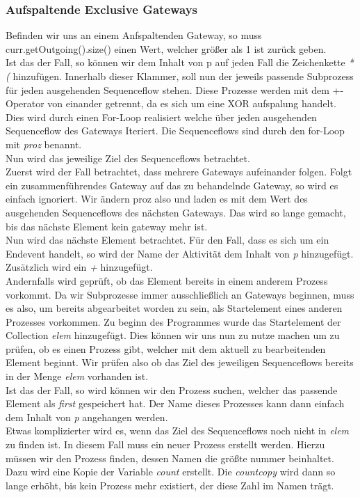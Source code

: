 \subsubsection{Aufspaltende Exclusive Gateways}
Befinden wir uns an einem Anfspaltenden Gateway, so muss curr.getOutgoing().size() einen Wert, welcher größer als 1 ist zurück geben.\\
Ist das der Fall, so können wir dem Inhalt von p auf jeden Fall die Zeichenkette \textit{*(} hinzufügen. Innerhalb dieser Klammer, soll nun der jeweils passende Subprozess für jeden ausgehenden Sequenceflow stehen. Diese Prozesse werden mit dem +-Operator von einander getrennt, da es sich um eine XOR aufspalung handelt.\\
Dies wird durch einen For-Loop realisiert welche über jeden ausgehenden Sequenceflow des Gateways Iteriert. Die Sequenceflows sind durch den for-Loop mit \textit{proz} benannt.\\
Nun wird das jeweilige Ziel des Sequenceflows betrachtet.\\
Zuerst wird der Fall betrachtet, dass mehrere Gateways aufeinander folgen. Folgt ein zusammenführendes Gateway auf das zu behandelnde Gateway, so wird es einfach ignoriert. Wir ändern proz also und laden es mit dem Wert des ausgehenden Sequenceflows des nächsten Gateways. Das wird so lange gemacht, bis das nächste Element kein gateway mehr ist.\\
Nun wird das nächste Element betrachtet.
Für den Fall, dass es sich um ein Endevent handelt, so wird der Name der Aktivität dem Inhalt von \textit{p} hinzugefügt. Zusätzlich wird ein \textit{+} hinzugefügt.\\
Andernfalls wird geprüft, ob das Element bereits in einem anderem Prozess vorkommt. Da wir Subprozesse immer ausschließlich an Gateways beginnen, muss es also, um bereits abgearbeitet worden zu sein, als Startelement eines anderen Prozesses vorkommen. Zu beginn des Programmes wurde das Startelement der Collection \textit{elem} hinzugefügt. Dies können wir uns nun zu nutze machen um zu prüfen, ob es einen Prozess gibt, welcher mit dem aktuell zu bearbeitenden Element beginnt. Wir prüfen also ob das Ziel des jeweiligen Sequenceflows bereits in der Menge \textit{elem} vorhanden ist.\\
Ist das der Fall, so wird können wir den Prozess suchen, welcher das passende Element als \textit{first} gespeichert hat. Der Name dieses Prozesses kann dann einfach dem Inhalt von \textit{p} angehangen werden.\\
Etwas komplizierter wird es, wenn das Ziel des Sequenceflows noch nicht in \textit{elem} zu finden ist. In diesem Fall muss ein neuer Prozess erstellt werden. Hierzu müssen wir den Prozess finden, dessen Namen die größte nummer beinhaltet. Dazu wird eine Kopie der Variable \textit{count} erstellt. Die \textit{countcopy} wird dann so lange erhöht, bis kein Prozess mehr existiert, der diese Zahl im Namen trägt.\\
